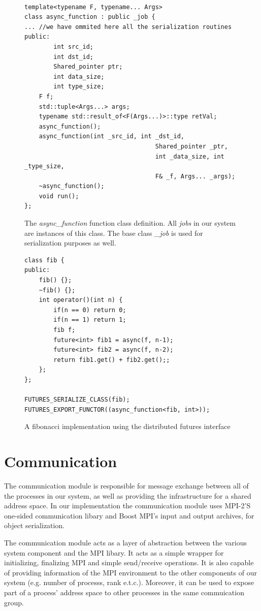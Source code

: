 \begin{figure}[here]
\begin{lstlisting}

template<typename F, typename... Args>
class async_function : public _job {
... //we have ommited here all the serialization routines
public:
		int src_id;
		int dst_id;
		Shared_pointer ptr;
		int data_size;
		int type_size;
    F f;
  	std::tuple<Args...> args;
    typename std::result_of<F(Args...)>::type retVal;
    async_function();
    async_function(int _src_id, int _dst_id, 
									Shared_pointer _ptr, 
									int _data_size, int _type_size,
									F& _f, Args... _args);
    ~async_function();
    void run();
};
\end{lstlisting}
\caption{The \emph{async\_function} function class definition.  All \emph{jobs} in our system are
instances of this class.  The base class \emph{\_job} is used for serialization purposes as well.}
\label{lst:async_function}
\end{figure}

\begin{figure}[here]
\begin{lstlisting}
class fib {
public:
	fib() {};
	~fib() {};
	int	operator()(int n) {
		if(n == 0) return 0;
		if(n == 1) return 1;
		fib f;
		future<int> fib1 = async(f, n-1);
		future<int> fib2 = async(f, n-2);
		return fib1.get() + fib2.get();;
	};
};

FUTURES_SERIALIZE_CLASS(fib);
FUTURES_EXPORT_FUNCTOR((async_function<fib, int>));

\end{lstlisting}
\caption{A fibonacci implementation using the distributed futures interface}
\label{lst:fib}
\end{figure}



\section{Communication}
\label{sect:communication}
The communication module is responsible for message exchange between all of the processes in our system,
as well as providing the infrastructure for a shared address space.
In our implementation the communication module uses MPI-2'S one-sided communication libary and Boost MPI's
input and output archives, for object serialization.

The communication module acts as a layer of abstraction between the various system component and the MPI libary.
It acts as a simple wrapper for initializing, finalizing MPI and simple send/receive operations.
It is also capable of providing information of the MPI environment to the other components of our system (e.g.
number of processs, rank e.t.c.).  Moreover, it can be used to expose part of a process' address space to other 
processes in the same commuication group.  

